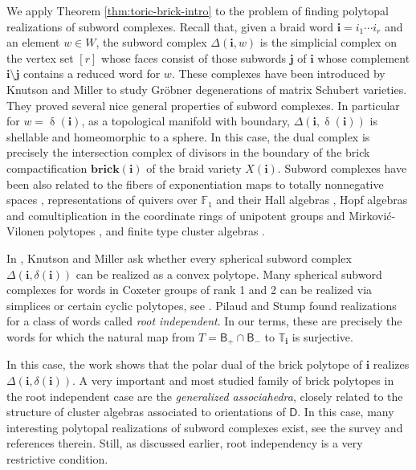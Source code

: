\documentclass[a4paper, 11pt]{amsart}
\newcommand{\brick}{\mathbf{brick}}
\newcommand{\borel}{\mathsf{B}}
\newcommand{\word}[1]{\mathbf{#1}}
\DeclareMathOperator{\dem}{\delta}
\newcommand{\dynkin}{\mathsf{D}}
\newcommand{\dil}[1]{\mathbb{T}_{#1}}
\theoremstyle{definition}
\begin{document}
We apply Theorem \ref{thm:toric-brick-intro} to the problem of finding polytopal realizations of subword complexes. Recall that, given a braid word $\word{i} = i_1\cdots i_r$ and an element $w \in W$, the subword complex $\Delta(\word{i}, w)$ is the simplicial complex on the vertex set $[r]$ whose faces consist of those subwords $\word{j}$ of $\word{i}$ whose complement $\word{i} \setminus \word{j}$ contains a reduced word for $w$. These complexes have been introduced by Knutson and Miller \cite{knutson_miller_04, knutson_miller_05} to study Gr\"obner degenerations of matrix Schubert varieties. They proved several nice general properties of subword complexes. In particular for $w = \dem(\word{i})$, as a topological manifold with boundary, $\Delta(\word{i}, \dem(\word{i}))$ is shellable and homeomorphic to a sphere. In this case, the dual complex is precisely the intersection complex of divisors in the boundary of the brick compactification $\brick(\word{i})$ of the braid variety $X(\word{i})$. Subword complexes have been also related to the fibers of exponentiation maps to totally nonnegative spaces \cite{DHM}, representations of quivers over $\mathbb{F}_1$ and their Hall algebras \cite{GoLi}, Hopf algebras and comultiplication in the coordinate rings of unipotent groups and Mirković-Vilonen polytopes \cite{BergeronCeballos, Zijun1}, and finite type cluster algebras \cite{pilaud_stump_15, JLS}. 

In \cite[Question 6.4]{knutson_miller_04}, Knutson and Miller ask whether every spherical subword complex $\Delta(\word{i}, \delta(\word{i}))$ can be realized as a convex polytope. Many spherical subword complexes for words in Coxeter groups of rank 1 and 2 can be realized via simplices or certain cyclic polytopes, see \cite[Section 6]{cls}. Pilaud and Stump \cite{pilaud_stump_15} found realizations for a class of words called \emph{root independent}. In our terms, these are precisely the words for which the natural map from $T = \borel_+ \cap \borel_-$ to $\dil{\word{i}}$ is surjective. 

In this case, the work \cite{pilaud_stump_15} shows that the polar dual of the brick polytope of $\word{i}$ realizes $\Delta(\word{i}, \delta(\word{i}))$.
A very important and most studied family of brick polytopes in the root independent case are the \emph{generalized associahedra}, closely related to the structure of cluster algebras associated to orientations of $\dynkin$. In this case, many interesting polytopal realizations of subword complexes exist, see the survey \cite{PSZ} and references therein. 
Still, as discussed earlier, root independency is a very restrictive condition. 
\end{document}
